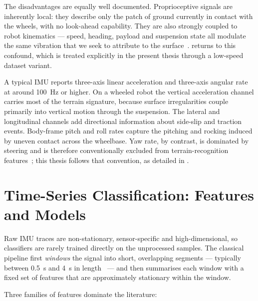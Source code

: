 The disadvantages are equally well documented. Proprioceptive signals are inherently local: they describe only the patch of ground currently in contact with the wheels, with no look-ahead capability. They are also strongly coupled to robot kinematics --- speed, heading, payload and suspension state all modulate the same vibration that we seek to attribute to the surface~\cite{Bermudez2012,Coyle2008}.  returns to this confound, which is treated explicitly in the present thesis through a low-speed dataset variant.

A typical IMU reports three-axis linear acceleration and three-axis angular rate at around \SI{100}{\hertz} or higher. On a wheeled robot the vertical acceleration channel carries most of the terrain signature, because surface irregularities couple primarily into vertical motion through the suspension. The lateral and longitudinal channels add directional information about side-slip and traction events. Body-frame pitch and roll rates capture the pitching and rocking induced by uneven contact across the wheelbase. Yaw rate, by contrast, is dominated by steering and is therefore conventionally excluded from terrain-recognition features~\cite{Brooks2005}; this thesis follows that convention, as detailed in .

\section{Time-Series Classification: Features and Models}
\label{sec:bg-features-ml}

Raw IMU traces are non-stationary, sensor-specific and high-dimensional, so classifiers are rarely trained directly on the unprocessed samples. The classical pipeline first \emph{windows} the signal into short, overlapping segments --- typically between \SI{0.5}{\second} and \SI{4}{\second} in length~\cite{Brooks2005,Weiss2011} --- and then summarises each window with a fixed set of features that are approximately stationary within the window.

Three families of features dominate the literature:

